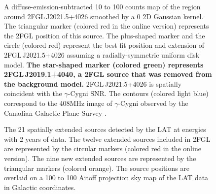 \documentclass[12pt,preprint]{aastex}
\newif\ifcolorfigure
\newcommand{\mev}{\text{MeV}\xspace}
\newcommand{\gev}{\text{GeV}\xspace}
\newcommand{\newtext}[1]{{\bfseries \color{red}#1}}
\begin{document}
\begin{figure}
    \ifcolorfigure
      \plotone{source_plots/source_Gamma_Cygni_color.eps}
    \else
    \fi
  \caption{A diffuse-emission-subtracted 
  10 \gev to 100 \gev counts map of the
  region around 2FGL\,J2021.5+4026 smoothed by a 0 2D Gaussian
  kernel. The triangular marker (colored red in the online version)
  represents the 2FGL position of this source.  The plus-shaped
  marker and the circle (colored red) represent the best fit position
  and extension of 2FGL\,J2021.5+4026 assuming a radially-symmetric
  uniform disk model.  
  \newtext{The star-shaped marker (colored green)
  represents 2FGL\,J2019.1+4040,
  a 2FGL source that was removed from the background model.}
  2FGL\,J2021.5+4026
  is spatially coincident with the $\gamma$-Cygni SNR.  The contours
  (colored light blue) correspond to the 408MHz image of $\gamma$-Cygni
  observed by the Canadian Galactic Plane Survey \citep{canadian_galactic_plane_survey}.
  }\label{1FGL_J2020.0+4049}
\end{figure}


\clearpage
  \begin{figure}
      \ifcolorfigure
      \plotone{summary_plots/allsky_extended_sources_color.eps}
      \else
      \fi
      \caption{The 21
      spatially extended sources detected by the LAT
      at \gev energies 
      with 2 years of data.  The twelve extended sources included in
      2FGL are represented by the circular markers (colored red in the online
      version).  The nine new extended sources are represented by
      the triangular markers (colored orange).
      The source positions are overlaid on a 100 \mev to 100 \gev 
      Aitoff projection sky map of the LAT data in Galactic coordinates.
}
\label{allsky_extended_sources}
  \end{figure}
\end{document}

